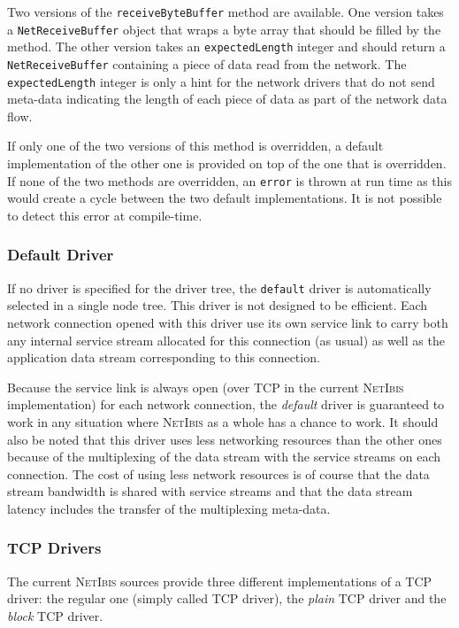 \documentclass[11pt]{book}
\def\NetIbis{\textsc{NetIbis}\xspace}
\begin{document}
Two versions of the \texttt{receiveByteBuffer} method are available.
One version takes a \texttt{NetReceiveBuffer} object that wraps a byte
array that should be filled by the method. The other version takes an
\texttt{expectedLength} integer and should return a
\texttt{NetReceiveBuffer} containing a piece of data read from the
network. The \texttt{expectedLength} integer is only a hint for the
network drivers that do not send meta-data indicating the length of
each piece of data as part of the network data flow. 

If only one of the two versions of this method is overridden, a
default implementation of the other one is provided on top of the one
that is overridden. If none of the two methods are overridden, an
\texttt{error} is thrown at run time as this would create a cycle
between the two default implementations. It is not possible to detect
this error at compile-time.

%
\subsubsection{Default Driver}
\label{sec:default-driver}

If no driver is specified for the driver tree, the \texttt{default}
driver is automatically selected in a single node tree. This driver is
not designed to be efficient. Each network connection opened with this
driver use its own service link to carry both any internal service
stream allocated for this connection (as usual) as well as the
application data stream corresponding to this connection.

Because the service link is always open (over TCP in the current
\NetIbis implementation) for each network connection, the
\emph{default} driver is guaranteed to work in any situation where
\NetIbis as a whole has a chance to work. It should also be noted that
this driver uses less networking resources than the other ones because
of the multiplexing of the data stream with the service streams on
each connection. The cost of using less network resources is of course
that the data stream bandwidth is shared with service streams and that
the data stream latency includes the transfer of the multiplexing
meta-data.

%
\subsubsection{TCP Drivers}
\label{sec:tcp-drivers}

The current \NetIbis sources provide three different implementations
of a TCP driver: the regular one (simply called TCP driver), the
\emph{plain} TCP driver and the \emph{block} TCP driver.
\end{document}

